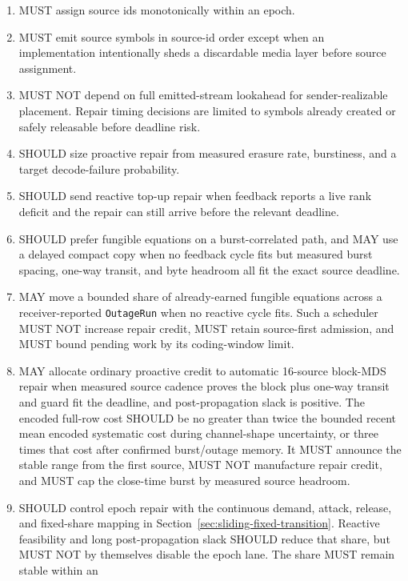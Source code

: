 \documentclass[11pt]{article}
\newcommand{\code}[1]{\ifmmode\text{\texttt{#1}}\else\texttt{#1}\fi}
\newcommand{\field}[1]{\code{#1}}
\begin{document}
\begin{enumerate}
\item MUST assign source ids monotonically within an epoch.
\item MUST emit source symbols in source-id order except when an implementation
      intentionally sheds a discardable media layer before source assignment.
\item MUST NOT depend on full emitted-stream lookahead for sender-realizable
      placement. Repair timing decisions are limited to symbols already created
      or safely releasable before deadline risk.
\item SHOULD size proactive repair from measured erasure rate, burstiness, and a
      target decode-failure probability.
\item SHOULD send reactive top-up repair when feedback reports a live rank
      deficit and the repair can still arrive before the relevant deadline.
\item SHOULD prefer fungible equations on a burst-correlated path, and MAY use a
      delayed compact copy when no feedback cycle fits but measured burst spacing,
      one-way transit, and byte headroom all fit the exact source deadline.
\item MAY move a bounded share of already-earned fungible equations across a
      receiver-reported \field{OutageRun} when no reactive cycle fits. Such a
      scheduler MUST NOT increase repair credit, MUST retain source-first
      admission, and MUST bound pending work by its coding-window limit.
\item MAY allocate ordinary proactive credit to automatic 16-source block-MDS
      repair when measured source cadence proves the block plus one-way transit
      and guard fit the deadline, and
      post-propagation slack is positive. The encoded full-row cost SHOULD be no
      greater than twice the bounded recent mean encoded systematic cost during
      channel-shape uncertainty, or three times that cost after confirmed
      burst/outage memory. It MUST announce the stable range from the first
      source, MUST NOT manufacture repair credit, and MUST cap the close-time
      burst by measured source headroom.
\item SHOULD control epoch repair with the continuous demand, attack,
      release, and fixed-share mapping in
      Section~\ref{sec:sliding-fixed-transition}. Reactive feasibility and long
      post-propagation slack SHOULD reduce that share, but MUST NOT by themselves
      disable the epoch lane. The share MUST remain stable within an

\end{enumerate}
\end{document}
